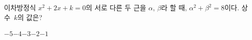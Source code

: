 이차방정식 $x^2+2x+k=0$의 서로 다른 두 근을 $\alpha$, $\beta$라 할 때, $\alpha^2+\beta^2=8$이다. 상수~$k$의 값은?
\begin{choices32}{$-5$}{$-4$}{$-3$}{$-2$}{$-1$}\end{choices32}
